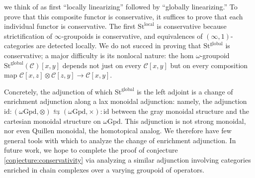 \documentclass[12pt]{article}
\theoremstyle{definition}
\newcommand{\C}{\mathcal{C}}
\newcommand{\stinfty}{\omega\text{Gpd}}
\newcommand{\id}{\text{id}}
\newcommand{\st}{\text{St}}
\begin{document}
	we think of as first ``locally linearizing'' followed by ``globally linearizing.''
	To prove that this composite functor is conservative, it suffices to prove that each individual functor is conservative.
	The first $\st^{\text{local}}$ is conservative because strictification of $\infty$-groupoids is conservative, and equivalences of $(\infty,1)$-categories are detected locally. 
	We do not succed in proving that $\st^{\text{global}}$ is conservative; a major difficulty is its nonlocal nature: the hom $\omega$-groupoid $\st^{\text{global}}(\C)[x,y]$ depends not just on every $\C[x,y]$ but on every composition map $\C[x,z] \otimes \C[z,y] \to \C[x,y]$. 
	\par Concretely, the adjunction of which $\st^{\text{global}}$ is the left adjoint is a change of enrichment adjunction along a lax monoidal adjunction: namely, the adjunction $\id: (\stinfty, \otimes) \leftrightarrows (\stinfty, \times): \id$ between the gray monoidal structure and the cartesian monoidal structure on $\stinfty$. 
	This adjunction is not strong monoidal, nor even Quillen monoidal, the homotopical analog.
	We therefore have few general tools with which to analyze the change of enrichment adjunction.
	In future work, we hope to complete the proof of conjecture \ref{conjecture:conservativity} via analyzing a similar adjunction involving categories enriched in chain complexes over a varying groupoid of operators.
\end{document}
